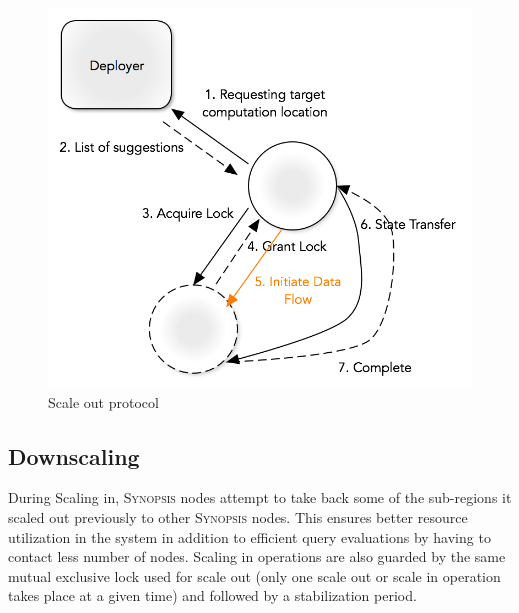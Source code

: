 \begin{figure}
    \centerline{\includegraphics[scale=0.55]{figures/scale-out-protocol.png}}
    \caption{Scale out protocol}
    \label{fig:scale-out-protocol}
\end{figure}
%
\subsection{Downscaling}
\label{subsec:scaling-in}
During Scaling in, \textsc{Synopsis} nodes attempt to take back some of the sub-regions it scaled out previously to other \textsc{Synopsis} nodes.
This ensures better resource utilization in the system in addition to efficient query evaluations by having to contact less number of nodes.
Scaling in operations are also guarded by the same mutual exclusive lock used for scale out (only one scale out or scale in operation takes place at a given time) and followed by a stabilization period.

